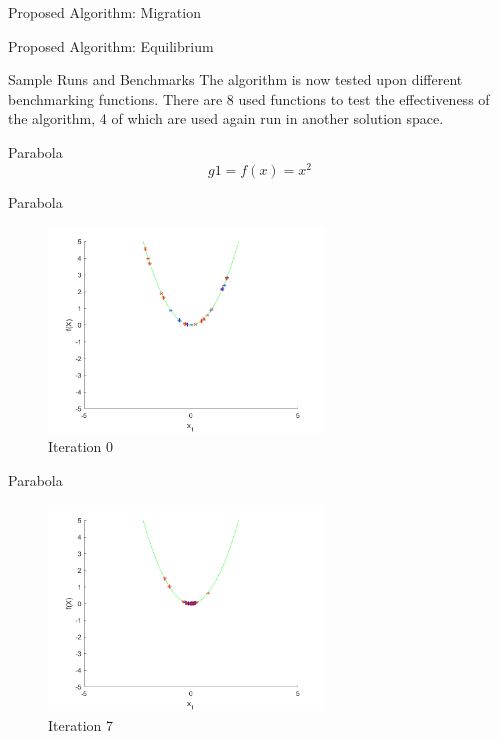 \documentclass[xcolor=table]{beamer}
\begin{document}
\begin{frame}{Proposed Algorithm: Migration}
\end{frame}

\begin{frame}{Proposed Algorithm: Equilibrium}
\end{frame}

\begin{frame}{Sample Runs and Benchmarks}
The algorithm is now tested upon different benchmarking functions. There are 8 used functions to test the effectiveness of the algorithm, 4 of which are used again run in another solution space.
\end{frame}
\begin{frame}{Parabola}
$$
  g1=f(x) = x^2
$$
\end{frame}
\begin{frame}{Parabola}
  \begin{figure}[h]
  \begin{center}
    \includegraphics[width=0.65\textwidth]{img/smpl/circ/loa-iter-0}
    \caption{Iteration 0}
  \end{center}
  \end{figure}
\end{frame}
\begin{frame}{Parabola}
  \begin{figure}[h]
  \begin{center}
    \includegraphics[width=0.65\textwidth]{img/smpl/circ/loa-iter-7}
    \caption{Iteration 7}
  \end{center}
  \end{figure}
\end{frame}
\end{document}
